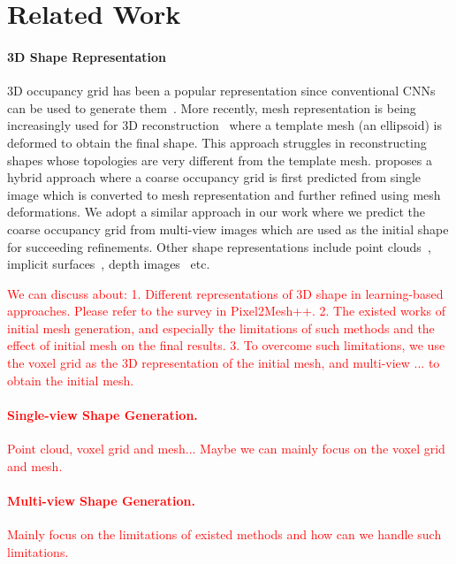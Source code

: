 \section{Related Work}

\paragraph{3D Shape Representation}
3D occupancy grid has been a popular representation since conventional CNNs can be used to generate them~\cite{3dr2n2,kar2017lsm}.
More recently, mesh representation is being increasingly used for 3D reconstruction~\cite{wang2018pixel2mesh,wen2019pixel2mesh++} where a template mesh (an ellipsoid) is deformed to obtain the final shape.
This approach struggles in reconstructing shapes whose topologies are very different from the template mesh.
\cite{gkioxari2019meshrcnn} proposes a hybrid approach where a coarse occupancy grid is first predicted from single image which is converted to mesh representation and further refined using mesh deformations.
We adopt a similar approach in our work where we predict the coarse occupancy grid from multi-view images which are used as the initial shape for succeeding refinements.
Other shape representations include point clouds~\cite{fan2017point,yang2018foldingnet,jia2020dv}, implicit surfaces~\cite{park2019deepsdf}, depth images~\cite{yao2018mvsnet,yao2019recurrent} etc.


\textcolor{Red}{
We can discuss about:
1. Different representations of 3D shape in learning-based approaches. Please refer to the survey in Pixel2Mesh++.
2. The existed works of initial mesh generation, and especially the limitations of such methods and the effect of initial mesh on the final results.
3. To overcome such limitations, we use the voxel grid as the 3D representation of the initial mesh, and multi-view ... to obtain the initial mesh.
\paragraph{Single-view Shape Generation.}
Point cloud, voxel grid and mesh... Maybe we can mainly focus on the voxel grid and mesh.
\paragraph{Multi-view Shape Generation.}
Mainly focus on the limitations of existed methods and how can we handle such limitations.
}

